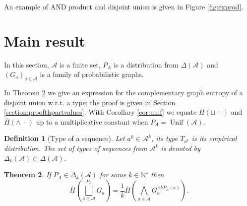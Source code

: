 \documentclass[conference,a4paper]{IEEEtran}
\DeclareMathOperator*{\Unif}{Unif}
\newtheorem{theorem}{Theorem}[section]
\newtheorem{definition}[theorem]{Definition}
\newtheorem{remark}[theorem]{Remark}
\begin{document}
An example of AND product and disjoint union is given in Figure \ref{fig:exprod}.

\section{Main result}\label{sec:main}

In this section, $\mathcal{A}$ is a finite set, $P_A$ is a distribution from $\Delta(\mathcal{A})$ and $(G_a)_{a \in \mathcal{A}}$ is a family of probabilistic graphs. 


In Theorem \ref{th:partvalues} we give an expression for the complementary graph entropy of a disjoint union w.r.t. a type; the proof is given in Section \ref{section:proofthpartvalues}. With Corollary \ref{cor:unif} we equate $\overline{H}(\sqcup \:\cdot\:)$ and $\overline{H}(\wedge \:\cdot\:)$ up to a multiplicative constant when $P_A = \Unif(\mathcal{A})$.

\begin{definition}[Type of a sequence]
    Let $a^k \in \mathcal{A}^k$, its type $T_{a^k}$ is its empirical distribution. The set of types of sequences from $\mathcal{A}^k$ is denoted by $\Delta_k(\mathcal{A}) \subset \Delta(\mathcal{A})$.%
\end{definition}

\begin{theorem}\label{th:partvalues}
    If $P_A \in \Delta_k(\mathcal{A})$ for some $k \in \mathbb{N}^\star$ then
    \begin{equation}
        \overline{H}\left(\bigsqcup_{a \in \mathcal{A}}^{P_A} G_a\right) = \frac{1}{k}\overline{H}\left(\bigwedge_{a \in \mathcal{A}} G_a^{\wedge k P_A(a)}\right).\label{eq:corpartvalues}
    \end{equation}
\end{theorem}

\end{document}

